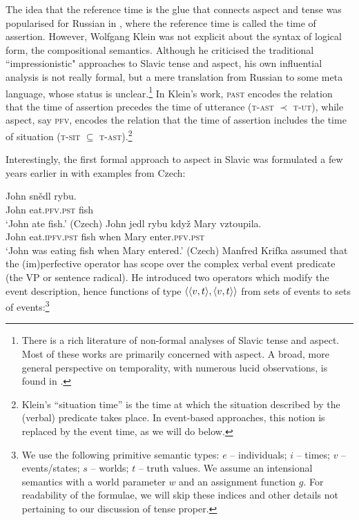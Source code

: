 \documentclass[output=paper,colorlinks,citecolor=brown]{langscibook}
\begin{document}
The idea that the reference time is the glue that connects aspect and tense was popularised for Russian in \citet{Klein1995}, where the reference time is called the time of assertion. However, Wolfgang Klein was not explicit about the syntax of logical form, the compositional semantics. Although he criticised the traditional ``impressionistic" approaches to Slavic tense and aspect, his own influential analysis is not really formal, but a mere translation from Russian to some meta language, whose status is unclear.\footnote{There is a rich literature of non-formal analyses of Slavic tense and aspect. Most of these works are primarily concerned with aspect. A broad, more general perspective on temporality, with numerous lucid observations, is found in \citet{paduceva96}.}
In Klein's work, \textsc{past} encodes the relation that the time of assertion precedes the time of utterance (\textsc{t-ast} $\prec$ \textsc{t-ut}), while aspect, say \textsc{pfv}, encodes the relation that the time of assertion includes the time of situation (\textsc{t-sit} $\subseteq$ \textsc{t-ast}).\footnote{Klein's ``situation time'' is the time at which the situation described by the (verbal) predicate takes place. In event-based approaches, this notion is replaced by the event time, as we will do below.}


Interestingly, the first formal approach to aspect in Slavic was formulated a few years earlier in \citet{Krifka1992} with examples from Czech:

\ea \ea\label{krifka:pf}\gll 
 John snědl rybu.\\
John eat.\textsc{pfv.pst} fish\\
\glt `John ate fish.' \hfill (Czech)
\ex\label{krifka:prog} \gll John jedl rybu když Mary vztoupila.\\
John eat.\textsc{ipfv.pst} fish when Mary enter.\textsc{pfv.pst}\\
\glt `John was eating fish when Mary entered.' \hfill (Czech)
\z\z
Manfred Krifka assumed that the (im)perfective
operator has scope over the complex verbal event predicate (the VP or sentence radical). He introduced two operators which modify the event description, hence functions  of type $\langle{\langle{v,t}\rangle,\langle{v,t}\rangle}\rangle$ from sets of events to sets of events:\footnote{We use the following primitive semantic types: $e$ -- individuals; $i$ -- times; $v$ -- events/states; $s$ -- worlds; $t$ -- truth values. We assume an intensional semantics with a world parameter $w$ and an assignment function $g$. For readability of the formulae, we will skip these indices and other details not pertaining to our discussion of tense proper.}
\end{document}
